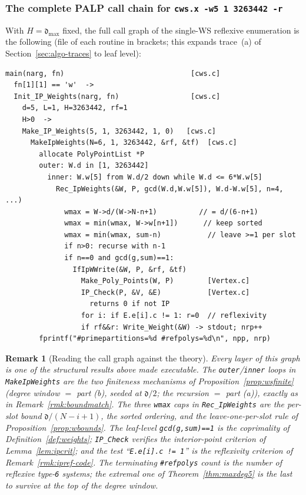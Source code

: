 \documentclass{amsart}
\newtheorem{remark}[theorem]{Remark}
\begin{document}
\subsubsection*{The complete PALP call chain for \texttt{cws.x -w5 1 3263442 -r}}

With $H=\mathfrak{d}_{\max}$ fixed, the full call graph of the single-WS
reflexive enumeration is the following (file of each routine in brackets;
this expands trace~(a) of Section~\ref{sec:algo-traces} to leaf level):

\begin{verbatim}
main(narg, fn)                              [cws.c]
  fn[1][1] == 'w'  ->
  Init_IP_Weights(narg, fn)                 [cws.c]
    d=5, L=1, H=3263442, rf=1
    H>0  ->
    Make_IP_Weights(5, 1, 3263442, 1, 0)   [cws.c]
      MakeIpWeights(N=6, 1, 3263442, &rf, &tf)  [cws.c]
        allocate PolyPointList *P
        outer: W.d in [1, 3263442]
          inner: W.w[5] from W.d/2 down while W.d <= 6*W.w[5]
            Rec_IpWeights(&W, P, gcd(W.d,W.w[5]), W.d-W.w[5], n=4, ...)
              wmax = W->d/(W->N-n+1)          // = d/(6-n+1)
              wmax = min(wmax, W->w[n+1])      // keep sorted
              wmax = min(wmax, sum-n)           // leave >=1 per slot
              if n>0: recurse with n-1
              if n==0 and gcd(g,sum)==1:
                IfIpWWrite(&W, P, &rf, &tf)
                  Make_Poly_Points(W, P)        [Vertex.c]
                  IP_Check(P, &V, &E)           [Vertex.c]
                    returns 0 if not IP
                  for i: if E.e[i].c != 1: r=0  // reflexivity
                  if rf&&r: Write_Weight(&W) -> stdout; nrp++
        fprintf("#primepartitions=%d #refpolys=%d\n", npp, nrp)
\end{verbatim}

\begin{remark}[Reading the call graph against the theory]\label{rmk:callgraph5}
Every layer of this graph is one of the structural results above made
executable. The \texttt{outer}/\texttt{inner} loops in \texttt{MakeIpWeights}
are the two finiteness mechanisms of Proposition~\ref{prop:wsfinite} (degree
window $=$ part (b), seeded at $\mathfrak{d}/2$; the recursion $=$ part (a)),
exactly as in Remark~\ref{rmk:boundmatch}. The three \texttt{wmax} caps in
\texttt{Rec\_IpWeights} are the per-slot bound $\mathfrak{d}/(N-i+1)$, the
sorted ordering, and the leave-one-per-slot rule of
Proposition~\ref{prop:wbounds}. The leaf-level \texttt{gcd(g,sum)==1} is the
coprimality of Definition~\ref{def:weights}; \texttt{IP\_Check} verifies the
interior-point criterion of Lemma~\ref{lem:ipcrit}; and the test
``\texttt{E.e[i].c != 1}'' is the reflexivity criterion of
Remark~\ref{rmk:ipref-code}. The terminating \texttt{\#refpolys} count is the
number of reflexive type-\texttt{6} systems; the extremal one of
Theorem~\ref{thm:maxdeg5} is the last to survive at the top of the degree
window.
\end{remark}
\end{document}
